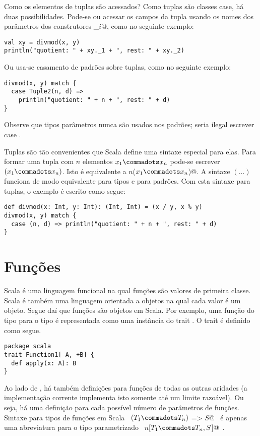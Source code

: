 Como os elementos de tuplas são acessados? Como tuplas são classes case, há duas possibilidades. 
Pode-se ou acessar os campos da tupla usando os nomes dos parâmetros dos construtores 
\lstinline@_$i$@, como no seguinte exemplo:
\begin{lstlisting}
val xy = divmod(x, y)
println("quotient: " + xy._1 + ", rest: " + xy._2)
\end{lstlisting}
Ou usa-se casamento de padrões sobre tuplas, como no seguinte exemplo: 
\begin{lstlisting}
divmod(x, y) match {
  case Tuple2(n, d) =>
    println("quotient: " + n + ", rest: " + d)
}
\end{lstlisting}
Observe que tipos parâmetros nunca são usados nos padrões; seria ilegal escrever 
case .

Tuplas são tão convenientes que Scala define uma sintaxe especial para elas. 
Para formar uma tupla com $n$ elementos $x_1 \commadots x_n$ pode-se escrever
$(x_1 \commadots x_n)$. Isto é equivalente a \lstinline@Tuple$n$($x_1 \commadots x_n$)@.
A sintaxe  $(...)$ funciona de modo equivalente para tipos e para padrões. Com esta
sintaxe para tuplas, o exemplo \lstinline@divmod@ é escrito como segue:
\begin{lstlisting}
def divmod(x: Int, y: Int): (Int, Int) = (x / y, x % y)
divmod(x, y) match {
  case (n, d) => println("quotient: " + n + ", rest: " + d)
}
\end{lstlisting}
\section{Funções}\label{sec:functions}

Scala é uma linguagem funcional na qual funções são valores de primeira classe. 
Scala é também uma linguagem orientada a objetos na qual cada valor é um objeto.  
Segue daí que funções são objetos em Scala. Por exemplo, uma função do tipo 
 para o tipo  é representada como uma instância do trait
. O trait  é definido como segue.

\begin{lstlisting}
package scala
trait Function1[-A, +B] {
  def apply(x: A): B
}
\end{lstlisting}

Ao lado de , há também definições para funções de todas as outras 
aridades (a implementação corrente implementa isto somente até um limite razoável).
Ou seja, há uma definição para cada possível número de parâmetros de funções. Sintaxe para 
tipos de funções em Scala ~\lstinline@$(T_1 \commadots T_n)$ => $S$@~ é apenas uma abreviatura 
para o tipo parametrizado  ~\lstinline@Function$n$[$T_1 \commadots T_n, S$]@~.


